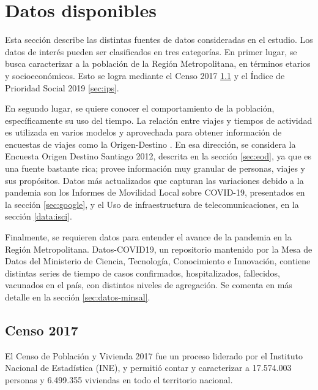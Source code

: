 \section{Datos disponibles}\label{sec:datos-disp}

Esta sección describe las distintas fuentes de datos consideradas en el estudio. Los datos de interés pueden ser clasificados en tres categorías. En primer lugar, se busca caracterizar a la población de la Región Metropolitana, en términos etarios y socioeconómicos. Esto se logra mediante el Censo 2017 \ref{sec:censo} y el Índice de Prioridad Social 2019 \ref{sec:ips}.

En segundo lugar, se quiere conocer el comportamiento de la población, específicamente su uso del tiempo. La relación entre viajes y tiempos de actividad es utilizada en varios modelos \cite{Kitamura1988}\cite{Axhausen1992} y aprovechada para obtener información de encuestas de viajes como la Origen-Destino \cite{Munizaga2011}. En esa dirección, se considera la Encuesta Origen Destino Santiago 2012, descrita en la sección \ref{sec:eod}, ya que es una fuente bastante rica; provee información muy granular de personas, viajes y sus propósitos. Datos más actualizados que capturan las variaciones debido a la pandemia son los Informes de Movilidad Local sobre COVID-19, presentados en la sección \ref{sec:google}, y el Uso de infraestructura de telecomunicaciones, en la sección \ref{data:isci}.

Finalmente, se requieren datos para entender el avance de la pandemia en la Región Metropolitana. Datos-COVID19, un repositorio \cite{MINCIENCIA} mantenido por la Mesa de Datos del Ministerio de Ciencia, Tecnología, Conocimiento e Innovación, contiene distintas series de tiempo de casos confirmados, hospitalizados, fallecidos, vacunados en el país, con distintos niveles de agregación. Se comenta en más detalle en la sección \ref{sec:datos-minsal}.


\subsection{Censo 2017}\label{sec:censo}

El Censo de Población y Vivienda 2017 fue un proceso liderado por el Instituto Nacional de Estadística (INE), y permitió contar y caracterizar a 17.574.003 personas y 6.499.355 viviendas en todo el territorio nacional.

